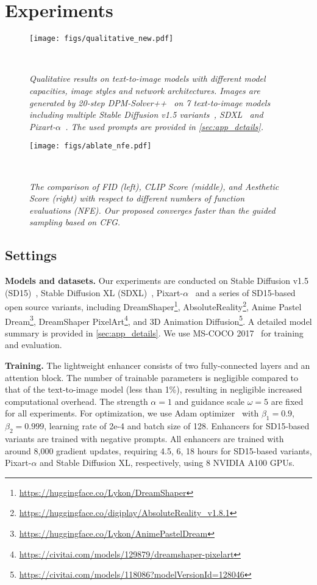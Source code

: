 \section{Experiments}
\label{exp}

\begin{figure*}[t!]
\texttt{[image: figs/qualitative\_new.pdf]}
\caption{\small \it
Qualitative results on text-to-image models with different model capacities, image styles and network architectures. Images are generated by 20-step DPM-Solver++~\cite{lu2022dpmpp} on 7 text-to-image models including multiple Stable Diffusion v1.5 variants~\cite{rombach2022ldm}, SDXL~\cite{podell2024sdxl} and Pixart-$\alpha$~\cite{chen2024pixart}. The used prompts are provided in \cref{sec:app_details}.
}
\label{fig:qualitative}
~\vspace{-1em}
\end{figure*}

\begin{figure*}[t]
    \texttt{[image: figs/ablate\_nfe.pdf]}
    \caption{\small \it The comparison of FID (left), CLIP Score (middle), and Aesthetic Score (right) with respect to different numbers of function evaluations (NFE). Our proposed \ourName converges faster than the guided sampling based on CFG. 
    }
    \label{fig:ablate_nfe}
~\vspace{-1em}
\end{figure*}

\subsection{Settings}
\textbf{Models and datasets.} Our experiments are conducted on Stable Diffusion v1.5 (SD15)~\cite{rombach2022ldm}, Stable Diffusion XL (SDXL)~\cite{podell2024sdxl}, Pixart-$\alpha$~\cite{chen2024pixart} and a series of SD15-based open source variants, 
including DreamShaper\footnote{\url{https://huggingface.co/Lykon/DreamShaper}}, 
AbsoluteReality\footnote{\url{https://huggingface.co/digiplay/AbsoluteReality_v1.8.1}},
Anime Pastel Dream\footnote{\url{https://huggingface.co/Lykon/AnimePastelDream}},
DreamShaper PixelArt\footnote{\url{https://civitai.com/models/129879/dreamshaper-pixelart}}, 
and 3D Animation Diffusion\footnote{\url{https://civitai.com/models/118086?modelVersionId=128046}}. 
A detailed model summary is provided in \cref{sec:app_details}. We use MS-COCO 2017~\cite{lin2014microsoft} for training and evaluation.

\textbf{Training.} The lightweight enhancer consists of two fully-connected layers and an attention block. The number of trainable parameters is negligible compared to that of the text-to-image model (less than 1\%), resulting in negligible increased computational overhead. 
The strength $\alpha=1$ and guidance scale $\omega=5$ are fixed for all experiments. For optimization, we use Adam optimizer~\cite{kingma2014adam} with $\beta_1=0.9$, $\beta_2=0.999$, learning rate of 2e-4 and batch size of 128. Enhancers for SD15-based variants are trained with negative prompts. All enhancers are trained with around 8,000 gradient updates, requiring 4.5, 6, 18 hours for SD15-based variants, Pixart-$\alpha$ and Stable Diffusion XL, respectively, using 8 NVIDIA A100 GPUs.

